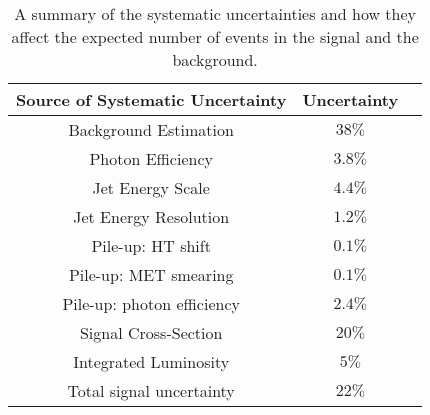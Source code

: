 \begin{table}
\begin{center}
\begin{tabular}{|c|c|c|}
\hline
{\bf Source of Systematic Uncertainty} & {\bf Uncertainty} \\
\hline
\hline
Background Estimation & $38\unit{\%}$ \\
\hline
\hline
Photon Efficiency & $3.8\unit{\%}$ \\
\hline
Jet Energy Scale & $4.4\unit{\%}$ \\
\hline
Jet Energy Resolution & $1.2\unit{\%}$ \\
\hline
Pile-up: HT shift & $0.1\unit{\%}$ \\
\hline
Pile-up: MET smearing & $0.1\unit{\%}$ \\
\hline
Pile-up: photon efficiency & $2.4\unit{\%}$ \\
\hline
Signal Cross-Section & $20\unit{\%}$ \\
\hline
Integrated Luminosity & $5\unit{\%}$ \\
\hline
\hline
Total signal uncertainty & $22\unit{\%}$ \\
\hline 
\end{tabular}
\end{center}
\caption{A summary of the systematic uncertainties and how they affect the
expected number of events in the signal and the background.}
\label{tab:Systematics_Summary}
\end{table}
